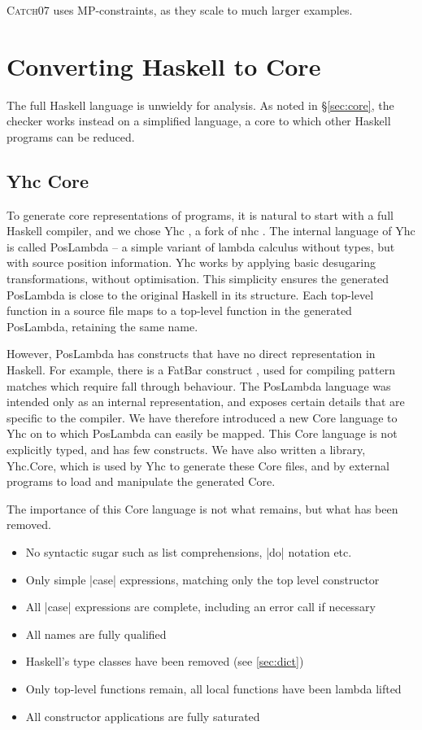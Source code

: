 \documentclass[preprint]{sigplanconf}
\newcommand{\C}[1]{\textsf{#1}}
\newcommand{\catch}{\textsc{Catch}}
\begin{document}
\catch07 uses MP-constraints, as they scale to much larger examples.

\section{Converting Haskell to Core}
\label{sec:transform}

The full Haskell language is unwieldy for analysis. As noted in \S\ref{sec:core}, the checker works instead on a simplified language, a core to which other Haskell programs can be reduced.

\subsection{Yhc Core}

To generate core representations of programs, it is natural to start with a full Haskell compiler, and we chose Yhc \citep{Yhc}, a fork of nhc \citep{nhc}. The internal language of Yhc is called PosLambda -- a simple variant of lambda calculus without types, but with source position information. Yhc works by applying basic desugaring transformations, without optimisation. This simplicity ensures the generated PosLambda is close to the original Haskell in its structure. Each top-level function in a source file maps to a top-level function in the generated PosLambda, retaining the same name.

However, PosLambda has constructs that have no direct representation in Haskell. For example, there is a FatBar construct \cite{spj:implementation}, used for compiling pattern matches which require fall through behaviour. The PosLambda language was intended only as an internal representation, and exposes certain details that are specific to the compiler. We have therefore introduced a new Core language to Yhc on to which PosLambda can easily be mapped. This Core language is not explicitly typed, and has few constructs. We have also written a library, Yhc.Core, which is used by Yhc to generate these Core files, and by external programs to load and manipulate the generated Core.

The importance of this Core language is not what remains, but what has been removed.

\begin{itemize}
\item No syntactic sugar such as list comprehensions, |do| notation etc.
\item Only simple |case| expressions, matching only the top level constructor
\item All |case| expressions are complete, including an \C{error} call if necessary
\item All names are fully qualified
\item Haskell's type classes have been removed (see \ref{sec:dict})
\item Only top-level functions remain, all local functions have been lambda lifted
\item All constructor applications are fully saturated
\end{itemize}
\end{document}
